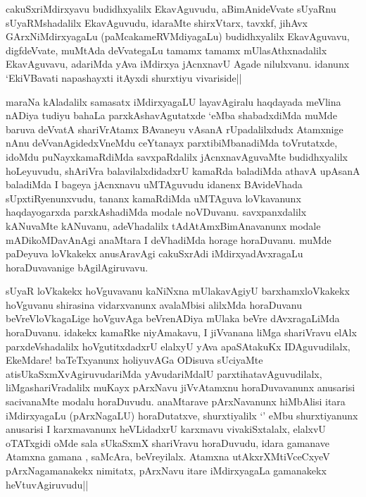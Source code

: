 
\begin{artha}
cakuSxriMdirxyavu budidhxyalilx EkavAguvudu, aBimAnideVvate sUyaRnu sUyaRMshadalilx EkavAguvudu, idaraMte shirxVtarx, tavxkf, jihAvx GArxNiMdirxyagaLu (paMcakameRVMdiyagaLu) budidhxyalilx EkavAguvavu, digfdeVvate, muMtAda deVvategaLu tamamx tamamx mUlasAthxnadalilx EkavAguvavu, adariMda yAva iMdirxya jAcnxnavU Agade nilulxvanu. idanunx `EkiVBavati napashayxti itAyxdi shurxtiyu vivariside||
\end{artha}


\begin{artha}
maraNa kAladalilx samasatx iMdirxyagaLU layavAgiralu haqdayada meVlina nADiya tudiyu bahaLa parxkAshavAgutatxde `\stext eMba shabadxdiMda muMde baruva deVvatA shariVrAtamx BAvaneyu vAsanA rUpadalilxdudx Atamxnige nAnu deVvanAgidedxVneMdu ceYtanayx parxtibiMbanadiMda toVrutatxde, idoMdu puNayxkamaRdiMda savxpaRdalilx jAcnxnavAguvaMte budidhxyalilx hoLeyuvudu, shAriVra balavilalxdidadxrU kamaRda baladiMda athavA upAsanA baladiMda I bageya jAcnxnavu uMTAguvudu idanenx BAvideVhada sUpxtiRyenunxvudu, tananx kamaRdiMda uMTAguva loVkavanunx haqdayogarxda parxkAshadiMda modale noVDuvanu. savxpanxdalilx kANuvaMte kANuvanu, adeVhadalilx tAdAtAmxBimAnavanunx modale mADikoMDavAnAgi anaMtara I deVhadiMda horage horaDuvanu. muMde paDeyuva loVkakekx anusAravAgi cakuSxrAdi iMdirxyadAvxragaLu horaDuvavanige bAgilAgiruvavu. 
\end{artha}%

\begin{artha}
sUyaR loVkakekx hoVguvavanu kaNiNxna mUlakavAgiyU barxhamxloVkakekx hoVguvanu shirasina vidarxvanunx avalaMbisi alilxMda horaDuvanu beVreVloVkagaLige hoVguvAga beVrenADiya mUlaka beVre dAvxragaLiMda horaDuvanu. idakekx kamaRke niyAmakavu, I jiVvanana liMga shariVravu elAlx parxdeVshadalilx hoVgutitxdadxrU elalxyU yAva apaSAtakuKx IDAguvudilalx, EkeMdare! baTeTxyanunx holiyuvAGa ODisuva sUciyaMte atisUkaSxmXvAgiruvudariMda yAvudariMdalU parxtihatavAguvudilalx, liMgashariVradalilx muKayx pArxNavu jiVvAtamxnu horaDuvavanunx anusarisi sacivanaMte modalu horaDuvudu. anaMtarave pArxNavanunx hiMbAlisi itara iMdirxyagaLu (pArxNagaLU) horaDutatxve, shurxtiyalilx `\stext ' eMbu shurxtiyanunx anusarisi I karxmavanunx heVLidadxrU karxmavu vivakiSxtalalx, elalxvU oTATxgidi oMde sala sUkaSxmX shariVravu horaDuvudu, idara gamanave Atamxna gamana , saMcAra, beVreyilalx. Atamxna utAkxrXMtiVceCxyeV pArxNagamanakekx nimitatx, pArxNavu itare iMdirxyagaLa gamanakekx heVtuvAgiruvudu||
\end{artha}

